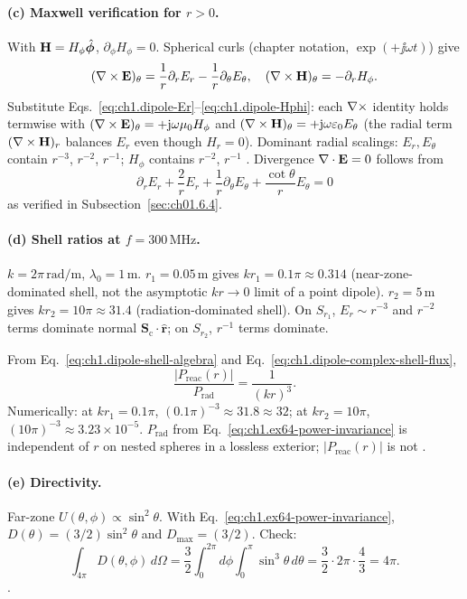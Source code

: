 \paragraph{(c) Maxwell verification for $r>0$.}
With $\mathbf{H}=H_\phi\hat{\boldsymbol\phi}$, $\partial_\phi H_\phi=0$. Spherical curls (chapter notation, $\exp(+\jj\omega t)$) give
\[
(\nabla\times\mathbf{E})_\theta=\frac{1}{r}\partial_r E_r-\frac{1}{r}\partial_\theta E_\theta,\quad
(\nabla\times\mathbf{H})_\theta=-\partial_r H_\phi.
\]
Substitute Eqs.~\eqref{eq:ch1.dipole-Er}--\eqref{eq:ch1.dipole-Hphi}: each $\nabla\times$ identity holds termwise with $(\nabla\times\mathbf{E})_\theta=+\mathrm{j}\omega\mu_0 H_\phi$ and $(\nabla\times\mathbf{H})_\theta=+\mathrm{j}\omega\varepsilon_0 E_\theta$ (the radial term $(\nabla\times\mathbf{H})_r$ balances $E_r$ even though $H_r=0$). Dominant radial scalings: $E_r,E_\theta$ contain $r^{-3}$, $r^{-2}$, $r^{-1}$; $H_\phi$ contains $r^{-2}$, $r^{-1}$ \cite{stratton1941}. Divergence $\nabla\cdot\mathbf{E}=0$ follows from
\[
\partial_r E_r+\frac{2}{r}E_r+\frac{1}{r}\partial_\theta E_\theta+\frac{\cot\theta}{r}E_\theta=0
\]
as verified in Subsection~\ref{sec:ch01.6.4}.

\paragraph{(d) Shell ratios at $f=300\,\mathrm{MHz}$.}
$k=2\pi\,\mathrm{rad/m}$, $\lambda_0=1\,\mathrm{m}$. $r_1=0.05\,\mathrm{m}$ gives $kr_1=0.1\pi\approx0.314$ (near-zone-dominated shell, not the asymptotic $kr\to0$ limit of a point dipole). $r_2=5\,\mathrm{m}$ gives $kr_2=10\pi\approx31.4$ (radiation-dominated shell). On $S_{r_1}$, $E_r\sim r^{-3}$ and $r^{-2}$ terms dominate normal $\mathbf{S}_\mathrm{c}\cdot\hat{\mathbf{r}}$; on $S_{r_2}$, $r^{-1}$ terms dominate.

From Eq.~\eqref{eq:ch1.dipole-shell-algebra} and Eq.~\eqref{eq:ch1.dipole-complex-shell-flux},
\[
\frac{|P_{\mathrm{reac}}(r)|}{P_{\mathrm{rad}}}=\frac{1}{(kr)^3}.
\]
Numerically: at $kr_1=0.1\pi$, $(0.1\pi)^{-3}\approx31.8\approx32$; at $kr_2=10\pi$, $(10\pi)^{-3}\approx3.23\times10^{-5}$. $P_{\mathrm{rad}}$ from Eq.~\eqref{eq:ch1.ex64-power-invariance} is independent of $r$ on nested spheres in a lossless exterior; $|P_{\mathrm{reac}}(r)|$ is not \cite{stratton1941,poynting1884}.

\paragraph{(e) Directivity.}
Far-zone $U(\theta,\phi)\propto\sin^2\theta$. With Eq.~\eqref{eq:ch1.ex64-power-invariance}, $D(\theta)=(3/2)\sin^2\theta$ and $D_{\max}=(3/2)$. Check:
\[
\int_{4\pi}D(\theta,\phi)\,d\Omega
=\frac{3}{2}\int_0^{2\pi}\!d\phi\int_0^{\pi}\sin^3\theta\,d\theta
=\frac{3}{2}\cdot2\pi\cdot\frac{4}{3}=4\pi.
\]
\cite{stratton1941,harrington2001}.

